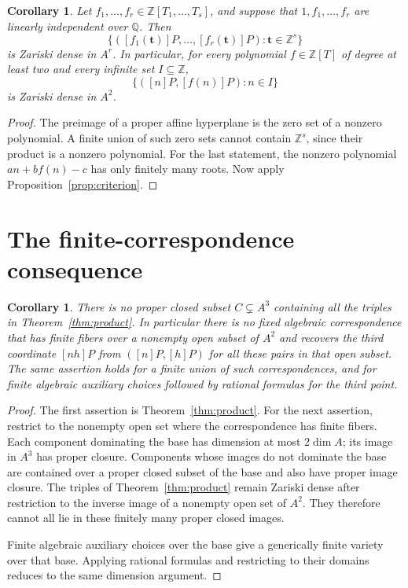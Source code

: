 \documentclass[11pt,a4paper]{article}
\newtheorem{corollary}[theorem]{Corollary}
\theoremstyle{remark}\newtheorem{remark}[theorem]{Remark}
\newcommand{\Z}{\mathbb Z}\newcommand{\Q}{\mathbb Q}
\begin{document}
\begin{corollary}\label{cor:polynomial}
Let \(f_1,\ldots,f_r\in\Z[T_1,\ldots,T_s]\), and suppose that
\(1,f_1,\ldots,f_r\) are linearly independent over \(\Q\).
Then
\[
 \{([f_1(\mathbf t)]P,\ldots,[f_r(\mathbf t)]P):
                            \mathbf t\in\Z^s\}
\]
is Zariski dense in \(A^r\).
In particular, for every polynomial \(f\in\Z[T]\) of degree
at least two and every infinite set \(I\subseteq\Z\),
\[
                        \{([n]P,[f(n)]P):n\in I\}
\]
is Zariski dense in \(A^2\).
\end{corollary}

\begin{proof}
The preimage of a proper affine hyperplane is the zero set of a
nonzero polynomial. A finite union of such zero sets cannot
contain \(\Z^s\), since their product is a nonzero polynomial.
For the last statement, the nonzero polynomial
\(an+bf(n)-c\) has only finitely many roots.
Now apply Proposition~\ref{prop:criterion}.
\end{proof}

\section{The finite-correspondence consequence}

\begin{corollary}\label{cor:finite}
There is no proper closed subset \(C\subsetneq A^3\) containing
all the triples in Theorem~\ref{thm:product}.
In particular there is no fixed algebraic correspondence that
has finite fibers over a nonempty open subset of \(A^2\) and
recovers the third coordinate \([nh]P\) from
\(([n]P,[h]P)\) for all these pairs in that open subset.
The same assertion holds for a finite union of such
correspondences, and for finite algebraic auxiliary choices
followed by rational formulas for the third point.
\end{corollary}

\begin{proof}
The first assertion is Theorem~\ref{thm:product}.
For the next assertion, restrict to the nonempty open set where
the correspondence has finite fibers. Each component dominating
the base has dimension at most \(2\dim A\); its image in
\(A^3\) has proper closure. Components whose images do not
dominate the base are contained over a proper closed subset
of the base and also have proper image closure.
The triples of Theorem~\ref{thm:product} remain Zariski dense
after restriction to the inverse image of a nonempty open set
of \(A^2\). They therefore cannot all lie in these finitely
many proper closed images.

Finite algebraic auxiliary choices over the base give a
generically finite variety over that base. Applying rational
formulas and restricting to their domains reduces to the
same dimension argument.
\end{proof}
\end{document}

